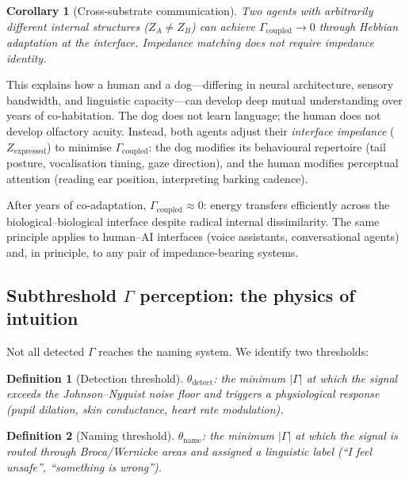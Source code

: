 \documentclass[aps,pre,twocolumn,superscriptaddress,floatfix]{revtex4-2}
\newtheorem{corollary}{Corollary}
\newtheorem{definition}{Definition}
\begin{document}
\begin{corollary}[Cross-substrate communication]
\label{cor:cross-substrate}
Two agents with arbitrarily different internal structures
($Z_A \neq Z_B$) can achieve $\Gamma_{\text{coupled}}\to 0$
through Hebbian adaptation at the interface.
Impedance \emph{matching} does not require impedance
\emph{identity}.
\end{corollary}

This explains how a human and a dog---differing in neural
architecture, sensory bandwidth, and linguistic
capacity---can develop deep mutual understanding over years
of co-habitation.  The dog does not learn language; the human
does not develop olfactory acuity.  Instead, both
agents adjust their \emph{interface impedance}
($Z_{\text{expressed}}$) to minimise $\Gamma_{\text{coupled}}$:
the dog modifies its behavioural repertoire
(tail posture, vocalisation timing, gaze direction), and
the human modifies perceptual attention (reading ear position,
interpreting barking cadence).

After years of co-adaptation, $\Gamma_{\text{coupled}}\approx 0$:
energy transfers efficiently across the biological--biological
interface despite radical internal dissimilarity.
The same principle applies to human--AI interfaces (voice
assistants, conversational agents) and, in principle, to
any pair of impedance-bearing systems.


\subsection{Subthreshold $\Gamma$ perception: the physics
  of intuition}
\label{sec:intuition}

Not all detected $\Gamma$ reaches the naming system.
We identify two thresholds:

\begin{definition}[Detection threshold]
$\theta_{\text{detect}}$: the minimum $|\Gamma|$ at which
the signal exceeds the Johnson--Nyquist noise floor and
triggers a physiological response (pupil dilation,
skin conductance, heart rate modulation).
\end{definition}

\begin{definition}[Naming threshold]
$\theta_{\text{name}}$: the minimum $|\Gamma|$ at which
the signal is routed through Broca/Wernicke areas and
assigned a linguistic label (``I feel unsafe'',
``something is wrong'').
\end{definition}
\end{document}
